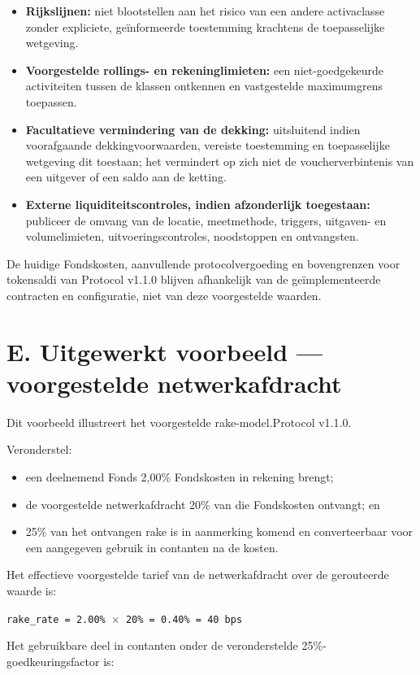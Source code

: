 \documentclass[11pt]{article}
\begin{document}
\begin{itemize}[leftmargin=*]
\item \textbf{Rijkslijnen:} niet blootstellen aan het risico van een andere activaclasse zonder expliciete, geïnformeerde toestemming krachtens de toepasselijke wetgeving.
\item \textbf{Voorgestelde rollings- en rekeninglimieten:} een niet-goedgekeurde activiteiten tussen de klassen ontkennen en vastgestelde maximumgrens toepassen.
\item \textbf{Facultatieve vermindering van de dekking:} uitsluitend indien voorafgaande dekkingvoorwaarden, vereiste toestemming en toepasselijke wetgeving dit toestaan; het vermindert op zich niet de voucherverbintenis van een uitgever of een saldo aan de ketting.
\item \textbf{Externe liquiditeitscontroles, indien afzonderlijk toegestaan:} publiceer de omvang van de locatie, meetmethode, triggers, uitgaven- en volumelimieten, uitvoeringscontroles, noodstoppen en ontvangsten.
\end{itemize}
De huidige Fondskosten, aanvullende protocolvergoeding en bovengrenzen voor tokensaldi van Protocol v1.1.0 blijven afhankelijk van de geïmplementeerde contracten en configuratie, niet van deze voorgestelde waarden.


\section*{E. Uitgewerkt voorbeeld --- voorgestelde netwerkafdracht}

Dit voorbeeld illustreert het voorgestelde rake-model.Protocol v1.1.0.

Veronderstel:

\begin{itemize}[leftmargin=*]
\item een deelnemend Fonds 2,00\% Fondskosten in rekening brengt;
\item de voorgestelde netwerkafdracht 20\% van die Fondskosten ontvangt; en
\item 25\% van het ontvangen rake is in aanmerking komend en converteerbaar voor een aangegeven gebruik in contanten na de kosten.
\end{itemize}
Het effectieve voorgestelde tarief van de netwerkafdracht over de gerouteerde waarde is:

\texttt{rake\_rate = 2.00\% $\times$ 20\% = 0.40\% = 40 bps}

Het gebruikbare deel in contanten onder de veronderstelde 25\%-goedkeuringsfactor is:
\end{document}
